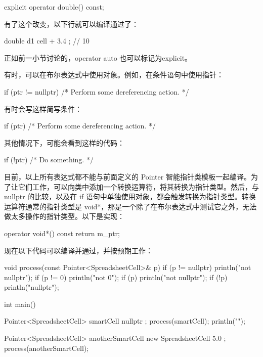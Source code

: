 \begin{cpp}
explicit operator double() const;
\end{cpp}

有了这个改变，以下行就可以编译通过了：

\begin{cpp}
double d1 { cell + 3.4 }; // 10
\end{cpp}

正如前一小节讨论的，operator auto 也可以标记为explicit。


有时，可以在布尔表达式中使用对象。例如，在条件语句中使用指针：

\begin{cpp}
if (ptr != nullptr) { /* Perform some dereferencing action. */ }
\end{cpp}

有时会写这样简写条件：

\begin{cpp}
if (ptr) { /* Perform some dereferencing action. */ }
\end{cpp}

其他情况下，可能会看到这样的代码：

\begin{cpp}
if (!ptr) { /* Do something. */ }
\end{cpp}

目前，以上所有表达式都不能与前面定义的 Pointer 智能指针类模板一起编译。为了让它们工作，可以向类中添加一个转换运算符，将其转换为指针类型。然后，与 nullptr 的比较，以及在 if 语句中单独使用对象，都会触发转换为指针类型。转换运算符通常的指针类型是 void*，那是一个除了在布尔表达式中测试它之外，无法做太多操作的指针类型。以下是实现：

\begin{cpp}
operator void*() const { return m_ptr; }
\end{cpp}

现在以下代码可以编译并通过，并按预期工作：

\begin{cpp}
void process(const Pointer<SpreadsheetCell>& p)
{
    if (p != nullptr) { println("not nullptr"); }
    if (p != 0)       { println("not 0"); }
    if (p)            { println("not nullptr"); }
    if (!p)           { println("nullptr"); }
}

int main()
{
    Pointer<SpreadsheetCell> smartCell { nullptr };
    process(smartCell);
    println("");

    Pointer<SpreadsheetCell> anotherSmartCell { new SpreadsheetCell { 5.0 } };
    process(anotherSmartCell);
}
\end{cpp}

